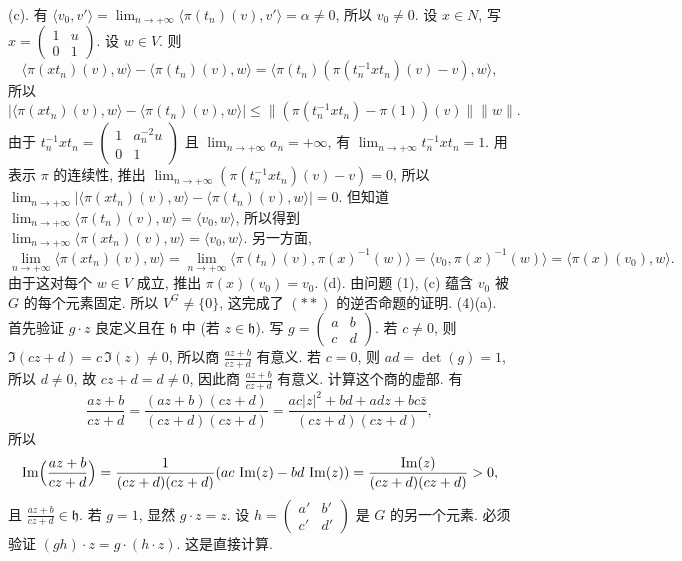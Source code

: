 \begin{solution}
(c). 有 $\langle v_0, v' \rangle = \lim_{n \to +\infty}\langle \pi(t_n)(v), v' \rangle = \alpha \neq 0$, 所以 $v_0 \neq 0$.
设 $x \in N$, 写 $x = \begin{pmatrix} 1 & u \\ 0 & 1 \end{pmatrix}$. 设 $w \in V$. 则
\[
\langle \pi(xt_n)(v), w \rangle - \langle \pi(t_n)(v), w \rangle = \langle \pi(t_n)(\pi(t_n^{-1}xt_n)(v) - v), w \rangle,
\]
所以
\[
|\langle \pi(xt_n)(v), w \rangle - \langle \pi(t_n)(v), w \rangle| \leq \|(\pi(t_n^{-1}xt_n) - \pi(1))(v)\|\|w\|.
\]
由于 $t_n^{-1}xt_n = \begin{pmatrix} 1 & a_n^{-2}u \\ 0 & 1 \end{pmatrix}$ 且 $\lim_{n \to +\infty}a_n = +\infty$, 有 $\lim_{n \to +\infty}t_n^{-1}xt_n = 1$. 用表示 $\pi$ 的连续性, 推出 $\lim_{n \to +\infty}(\pi(t_n^{-1}xt_n)(v) - v) = 0$, 所以 $\lim_{n \to +\infty}|\langle \pi(xt_n)(v), w \rangle - \langle \pi(t_n)(v), w \rangle| = 0$. 但知道 $\lim_{n \to +\infty}\langle \pi(t_n)(v), w \rangle = \langle v_0, w \rangle$, 所以得到 $\lim_{n \to +\infty}\langle \pi(xt_n)(v), w \rangle = \langle v_0, w \rangle$. 另一方面,
\[
\lim_{n \to +\infty}\langle \pi(xt_n)(v), w \rangle = \lim_{n \to +\infty}\langle \pi(t_n)(v), \pi(x)^{-1}(w) \rangle = \langle v_0, \pi(x)^{-1}(w) \rangle = \langle \pi(x)(v_0), w \rangle.
\]
由于这对每个 $w \in V$ 成立, 推出 $\pi(x)(v_0) = v_0$.
(d). 由问题 (1), (c) 蕴含 $v_0$ 被 $G$ 的每个元素固定. 所以 $V^G \neq \{0\}$, 这完成了 $(**)$ 的逆否命题的证明.
(4)(a). 首先验证 $g \cdot z$ 良定义且在 $\mathfrak{h}$ 中 (若 $z \in \mathfrak{h}$). 写 $g = \begin{pmatrix} a & b \\ c & d \end{pmatrix}$. 若 $c \neq 0$, 则 $\Im(cz + d) = c\,\Im(z) \neq 0$, 所以商 $\frac{az+b}{cz+d}$ 有意义. 若 $c = 0$, 则 $ad = \det(g) = 1$, 所以 $d \neq 0$, 故 $cz + d = d \neq 0$, 因此商 $\frac{az+b}{cz+d}$ 有意义. 计算这个商的虚部. 有
\[
\frac{az + b}{cz + d} = \frac{(az + b)(cz + d)}{(cz + d)(cz + d)} = \frac{ac|z|^2 + bd + adz + bc\bar{z}}{(cz + d)(cz + d)},
\]
所以
\[
\Im\Bigl(\frac{az + b}{cz + d}\Bigr) = \frac{1}{(cz + d)(cz + d)}(ac\,\Im(z) - bd\,\Im(z)) = \frac{\Im(z)}{(cz + d)(cz + d)} > 0,
\]
且 $\frac{az+b}{cz+d} \in \mathfrak{h}$.
若 $g = 1$, 显然 $g \cdot z = z$. 设 $h = \begin{pmatrix} a' & b' \\ c' & d' \end{pmatrix}$ 是 $G$ 的另一个元素. 必须验证 $(gh) \cdot z = g \cdot (h \cdot z)$. 这是直接计算.

\end{solution}
